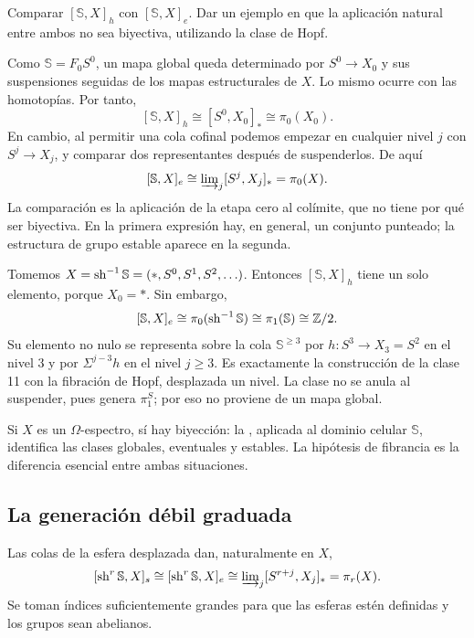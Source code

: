 \begin{ejer}\label{ejer:c19-global-eventual}
Comparar $[\mathbb S,X]_h$ con $[\mathbb S,X]_e$. Dar un ejemplo en que la aplicación natural entre ambos no sea biyectiva, utilizando la clase de Hopf.
\end{ejer}
\begin{sol}
Como $\mathbb S=F_0S^0$, un mapa global queda determinado por $S^0\to X_0$ y sus suspensiones seguidas de los mapas estructurales de $X$. Lo mismo ocurre con las homotopías. Por tanto,
\[
[\mathbb S,X]_h\cong[S^0,X_0]_*\cong\pi_0(X_0).
\]
En cambio, al permitir una cola cofinal podemos empezar en cualquier nivel $j$ con $S^j\to X_j$, y comparar dos representantes después de suspenderlos. De aquí
\[
[\mathbb S,X]_e\cong\varinjlim\nolimits_j[S^j,X_j]_*
=\pi_0(X).
\]
La comparación es la aplicación de la etapa cero al colímite, que no tiene por qué ser biyectiva. En la primera expresión hay, en general, un conjunto punteado; la estructura de grupo estable aparece en la segunda.

Tomemos $X=\operatorname{sh}^{-1}\mathbb S=(*,S^0,S^1,S^2,\ldots)$. Entonces $[\mathbb S,X]_h$ tiene un solo elemento, porque $X_0=*$. Sin embargo,
\[
[\mathbb S,X]_e\cong\pi_0(\operatorname{sh}^{-1}\mathbb S)
\cong\pi_1(\mathbb S)\cong\mathbb Z/2.
\]
Su elemento no nulo se representa sobre la cola $\mathbb S^{\ge3}$ por
$h\colon S^3\to X_3=S^2$ en el nivel $3$ y por $\Sigma^{j-3}h$ en el nivel $j\ge3$. Es exactamente la construcción de la clase 11 con la fibración de Hopf, desplazada un nivel. La clase no se anula al suspender, pues genera $\pi_1^S$; por eso no proviene de un mapa global.

Si $X$ es un $\Omega$-espectro, sí hay biyección: la , aplicada al dominio celular $\mathbb S$, identifica las clases globales, eventuales y estables. La hipótesis de fibrancia es la diferencia esencial entre ambas situaciones.
\end{sol}

\subsection{La generación débil graduada}
Las colas de la esfera desplazada dan, naturalmente en $X$,
\begin{equation}\label{eq:c19-esfera-pi}
[\operatorname{sh}^r\mathbb S,X]_s\cong[\operatorname{sh}^r\mathbb S,X]_e
\cong\varinjlim\nolimits_j[S^{r+j},X_j]_*
=\pi_r(X).
\end{equation}
Se toman índices suficientemente grandes para que las esferas estén definidas y los grupos sean abelianos.

